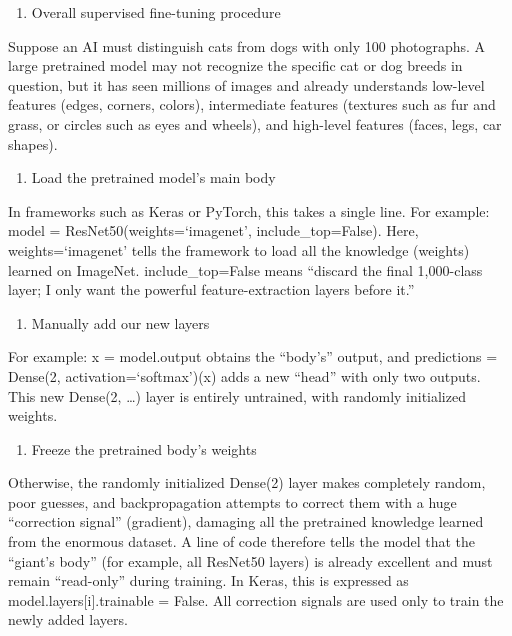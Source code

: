 \begin{enumerate}
\def\labelenumi{\arabic{enumi}.}
\setcounter{enumi}{1}
\tightlist
\item
  Overall supervised fine-tuning procedure
\end{enumerate}

Suppose an AI must distinguish cats from dogs with only 100 photographs. A large pretrained model may not recognize the specific cat or dog breeds in question, but it has seen millions of images and already understands low-level features (edges, corners, colors), intermediate features (textures such as fur and grass, or circles such as eyes and wheels), and high-level features (faces, legs, car shapes).

\begin{enumerate}
\def\labelenumi{(\arabic{enumi})}
\tightlist
\item
  Load the pretrained model's main body
\end{enumerate}

In frameworks such as Keras or PyTorch, this takes a single line. For example: model = ResNet50(weights=`imagenet', include\_top=False). Here, weights=`imagenet' tells the framework to load all the knowledge (weights) learned on ImageNet. include\_top=False means ``discard the final 1,000-class layer; I only want the powerful feature-extraction layers before it.''

\begin{enumerate}
\def\labelenumi{(\arabic{enumi})}
\setcounter{enumi}{1}
\tightlist
\item
  Manually add our new layers
\end{enumerate}

For example: x = model.output obtains the ``body's'' output, and predictions = Dense(2, activation=`softmax')(x) adds a new ``head'' with only two outputs. This new Dense(2, \ldots) layer is entirely untrained, with randomly initialized weights.

\begin{enumerate}
\def\labelenumi{(\arabic{enumi})}
\setcounter{enumi}{2}
\tightlist
\item
  Freeze the pretrained body's weights
\end{enumerate}

Otherwise, the randomly initialized Dense(2) layer makes completely random, poor guesses, and backpropagation attempts to correct them with a huge ``correction signal'' (gradient), damaging all the pretrained knowledge learned from the enormous dataset. A line of code therefore tells the model that the ``giant's body'' (for example, all ResNet50 layers) is already excellent and must remain ``read-only'' during training. In Keras, this is expressed as model.layers{[}i{]}.trainable = False. All correction signals are used only to train the newly added layers.


